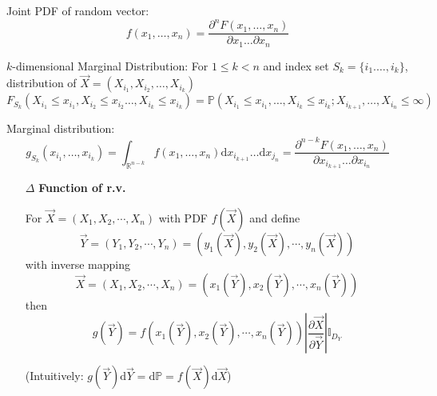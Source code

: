     Joint PDF of random vector: 
    \begin{equation}
        f(x_1,\ldots,x_n)=\dfrac{\partial^n F(x_1,\ldots,x_n)}{\partial x_1\ldots\partial x_n}
    \end{equation}

    $k$-dimensional Marginal Distribution: For $1\leq k<n$ and index set $S_k=\{i_1.\ldots,i_k\}$, distribution of $\vec{X}=(X_{i_1},X_{i_2},\ldots,X_{i_k})$
    \begin{equation}F_{S_k}(X_{i_1}\leq x_{i_1},X_{i_2}\leq x_{i_2}\ldots,X_{i_k}\leq x_{i_k})=\mathbb{P}(X_{i_1}\leq x_{i_1},\ldots,X_{i_k}\leq x_{i_k};X_{i_{k+1}},\ldots,X_{i_n}\leq\infty)\end{equation}

    Marginal distribution: 
    \begin{equation}
        g_{S_k}(x_{i_1},\ldots,x_{i_k})=\int_{\mathbb{R}^{n-k}}f(x_1,\ldots,x_n)\mathrm{d}x_{i_{k+1}}\ldots\mathrm{d}x_{j_n}=\dfrac{\partial^{n-k}F(x_1,\ldots,x_n)}{\partial x_{i_{k+1}}\ldots\partial x_{i_n}}
    \end{equation}


    \begin{itemize}
        \item[$\Delta$] \textbf{Function of r.v.}
        
        For $\vec{X}=(X_1,X_2,\cdots,X_n)$ with PDF $f(\vec{X})$ and define 
        \begin{equation}    
            \vec{Y}=(Y_1,Y_2,\cdots,Y_n)=\left(y_1(\vec{X}),y_2(\vec{X}),\cdots,y_n(\vec{X})\right)
        \end{equation}
        with inverse mapping
        \begin{equation}    
            \vec{X}=(X_1,X_2,\cdots,X_n)=\left(x_1(\vec{Y}),x_2(\vec{Y}),\cdots,x_n(\vec{Y})\right)
        \end{equation}
        then
        \begin{equation}    
            g(\vec{Y})= f\left(x_1(\vec{Y}),x_2(\vec{Y}),\cdots,x_n(\vec{Y})\right)\left|\frac{\partial \vec{X}}{\partial\vec{Y}}\right|\mathbb{I}_{D_Y}
        \end{equation}

        (Intuitively: $g(\vec{Y} )\mathrm{d}\vec{Y}=\mathrm{d}\mathbb{P}=f(\vec{X})\mathrm{d}\vec{X}$)
    \end{itemize}



    




